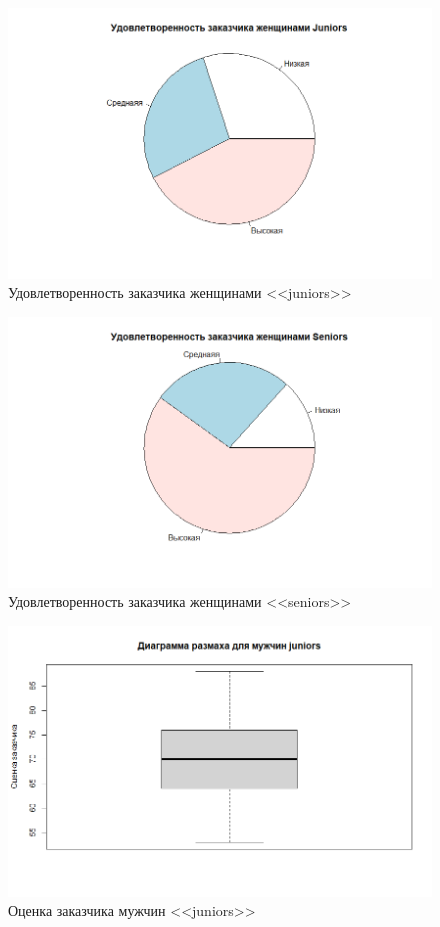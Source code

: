 \begin{figure}[H]
	\centering
	\includegraphics[width=\linewidth]{figwj}
	\caption{Удовлетворенность заказчика женщинами <<juniors>>}
\end{figure}

\begin{figure}[H]
	\centering
	\includegraphics[width=\linewidth]{figws}
	\caption{Удовлетворенность заказчика женщинами <<seniors>>}
\end{figure}

\begin{figure}[H]
	\centering
	\includegraphics[width=\linewidth]{figboxmj}
	\caption{Оценка заказчика мужчин <<juniors>>}
\end{figure}

